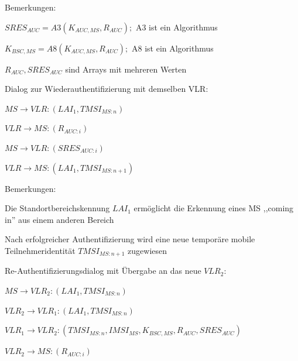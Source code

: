 \documentclass[a4paper]{article}
\begin{document}
\begin{multicols}{3}
      \begin{itemize*}
            \item Bemerkungen:
            \begin{itemize*}
                  \item $SRES_{AUC} = A3(K_{AUC,MS}, R_{AUC});$ A3 ist ein Algorithmus
                  \item $K_{BSC,MS} = A8(K_{AUC,MS}, R_{AUC});$ A8 ist ein Algorithmus
                  \item $R_{AUC}, SRES_{AUC}$ sind Arrays mit mehreren Werten
            \end{itemize*}
            \item Dialog zur Wiederauthentifizierung mit demselben VLR:
            \begin{enumerate*}
                  \def\labelenumi{\arabic{enumi}.}
                  \item $MS \rightarrow VLR: (LAI_1 , TMSI_{MS:n})$
                  \item $VLR \rightarrow MS: (R_{AUC:i})$
                  \item $MS \rightarrow VLR: (SRES_{AUC:i})$
                  \item $VLR \rightarrow MS: (LAI_1, TMSI_{MS:n+1})$
            \end{enumerate*}
            \item Bemerkungen:
            \begin{itemize*}
                  \item Die Standortbereichskennung $LAI_1$ ermöglicht die Erkennung eines MS ,,coming in'' aus einem anderen Bereich
                  \item Nach erfolgreicher Authentifizierung wird eine neue temporäre mobile Teilnehmeridentität $TMSI_{MS:n+1}$ zugewiesen
            \end{itemize*}
            \item Re-Authentifizierungsdialog mit Übergabe an das neue $VLR_2$:
            \begin{enumerate*}
                  \def\labelenumi{\arabic{enumi}.}
                  \item $MS \rightarrow VLR_2: (LAI_1, TMSI_{MS:n})$
                  \item $VLR_2 \rightarrow VLR_1: (LAI_1, TMSI_{MS:n})$
                  \item $VLR_1 \rightarrow VLR_2: (TMSI_{MS:n}, IMSI_{MS}, K_{BSC,MS}, R_{AUC}, SRES_{AUC})$
                  \item $VLR_2 \rightarrow MS: (R_{AUC:i})$

\end{enumerate*}
\end{itemize*}
\end{multicols}
\end{document}
